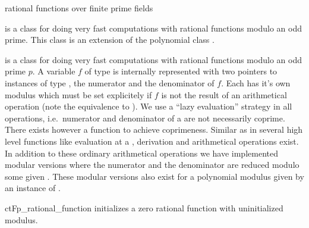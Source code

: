 

\NAME

 \dotfill rational functions over finite prime
fields



\ABSTRACT

 is a class for doing very fast computations with rational functions
modulo an odd prime.  This class is an extension of the polynomial class .



\DESCRIPTION

 is a class for doing very fast computations with rational functions
modulo an odd prime $p$.  A variable $f$ of type  is internally
represented with two pointers to instances of type , the numerator and the
denominator of $f$.  Each  has it's own modulus which must be set
explicitely if $f$ is not the result of an arithmetical operation (note the equivalence to
).  We use a ``lazy evaluation'' strategy in all operations, i.e.~numerator
and denominator of a  are not necessarily coprime.  There exists
however a function to achieve coprimeness.  Similar as in  several high
level functions like evaluation at a , derivation and arithmetical operations
exist.  In addition to these ordinary arithmetical operations we have implemented modular
versions where the numerator and the denominator are reduced modulo some given
.  These modular versions also exist for a polynomial modulus given by an
instance of .



\CONS

\begin{fcode}{ct}{Fp_rational_function}{}
  initializes a zero rational function with uninitialized modulus.
\end{fcode}

